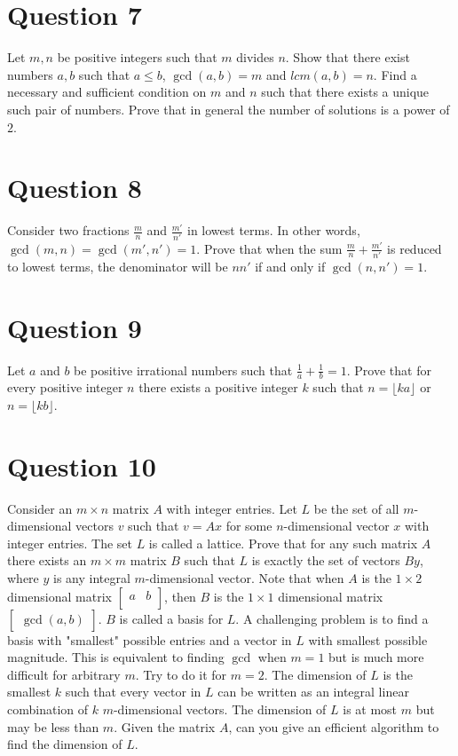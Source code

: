 \documentclass[12pt]{report}
\begin{document}
\section*{Question 7}
Let $m, n$ be positive integers such that $m$ divides $n$. Show that there exist numbers $a, b$ such that $a \leq b$, $\gcd(a, b) = m$ and $lcm(a, b) = n$. Find a necessary and sufficient condition on $m$ and $n$ such that there exists a unique such pair of numbers. Prove that in general the number of solutions is a power of $2$.
\section*{Question 8}
Consider two fractions $\frac{m}{n}$ and $\frac{m'}{n'}$ in lowest terms. In other words, $\gcd(m, n) = \gcd(m', n') = 1$. Prove that when the sum $\frac{m}{n} + \frac{m'}{n'}$ is reduced to lowest terms, the denominator will be $nn'$ if and only if $\gcd(n, n') = 1$.
\section*{Question 9}
Let $a$ and $b$ be positive irrational numbers such that $\frac{1}{a} + \frac{1}{b} = 1$. Prove that for every positive integer $n$ there exists a positive integer $k$ such that $n = \lfloor ka\rfloor$ or $n = \lfloor kb \rfloor$.
\section*{Question 10}
Consider an $m \times n$ matrix $A$ with integer entries. Let $L$ be the set of all $m$-dimensional vectors $v$ such that $v = Ax$ for some $n$-dimensional vector $x$ with integer entries. The set $L$ is called a lattice. Prove that for any such matrix $A$ there exists an $m \times m$ matrix $B$ such that $L$ is exactly the set of vectors $By$, where $y$ is any integral $m$-dimensional vector. Note that when $A$ is the $1 \times 2$ dimensional matrix $\begin{bmatrix}
  a & b\\
\end{bmatrix}$, then $B$ is the $1 \times 1$ dimensional matrix $\begin{bmatrix}
  \gcd(a, b)
\end{bmatrix}$. $B$ is called a basis for $L$. A challenging problem is to find a basis with "smallest" possible entries and a vector in $L$ with smallest possible magnitude. This is equivalent to finding $\gcd$ when $m = 1$ but is much more difficult for arbitrary $m$. Try to do it for $m = 2$. The dimension of $L$ is the smallest $k$ such that every vector in $L$ can be written as an integral linear combination of $k$ $m$-dimensional vectors. The dimension of $L$ is at most $m$ but may be less than $m$. Given the matrix $A$, can you give an efficient algorithm to find the dimension of $L$.
\end{document}
